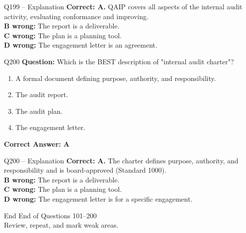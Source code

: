 \documentclass[aspectratio=169,10pt]{beamer}
\begin{document}
	\begin{frame}[t]{Q199 -- Explanation}
		\small
		\textbf{Correct: A.} QAIP covers all aspects of the internal audit activity, evaluating conformance and improving. \\[4pt]
		\textbf{B wrong:} The report is a deliverable. \\[2pt]
		\textbf{C wrong:} The plan is a planning tool. \\[2pt]
		\textbf{D wrong:} The engagement letter is an agreement.
	\end{frame}
	
	\begin{frame}[t]{Q200}
		\small
		\textbf{Question:} Which is the BEST description of "internal audit charter"?
		\begin{enumerate}[label=\Alph*.,itemsep=1pt,topsep=2pt]
			\item A formal document defining purpose, authority, and responsibility.
			\item The audit report.
			\item The audit plan.
			\item The engagement letter.
		\end{enumerate}
		\vspace{4pt}
		\textbf{Correct Answer: A}
	\end{frame}
	
	\begin{frame}[t]{Q200 -- Explanation}
		\small
		\textbf{Correct: A.} The charter defines purpose, authority, and responsibility and is board-approved (Standard 1000). \\[4pt]
		\textbf{B wrong:} The report is a deliverable. \\[2pt]
		\textbf{C wrong:} The plan is a planning tool. \\[2pt]
		\textbf{D wrong:} The engagement letter is for a specific engagement.
	\end{frame}
	
	\begin{frame}{End}
		\centering
		\Large End of Questions 101--200\\[8pt]
		\normalsize Review, repeat, and mark weak areas.
	\end{frame}
	
\end{document}
